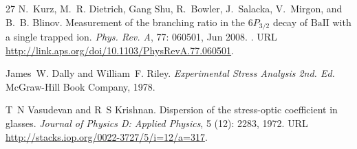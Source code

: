 \documentclass[%
 reprint,
 amsmath,amssymb,
 aps,
]{revtex4-1}
\begin{document}
\begin{thebibliography}{27}
N.~Kurz, M.~R. Dietrich, Gang Shu, R.~Bowler, J.~Salacka, V.~Mirgon, and B.~B.
  Blinov.
\newblock Measurement of the branching ratio in the $6{P}_{3/2}$ decay of
  $\mathrm{Ba} \mathrm{II}$ with a single trapped ion.
\newblock \emph{Phys. Rev. A}, 77: 060501, Jun 2008.
\newblock {}.
\newblock URL \url{http://link.aps.org/doi/10.1103/PhysRevA.77.060501}.

James~W. Dally and William~F. Riley.
\newblock \emph{Experimental Stress Analysis 2nd. Ed.}
\newblock McGraw-Hill Book Company, 1978.

T~N Vasudevan and R~S Krishnan.
\newblock Dispersion of the stress-optic coefficient in glasses.
\newblock \emph{Journal of Physics D: Applied Physics}, 5
  (12): 2283, 1972.
\newblock URL \url{http://stacks.iop.org/0022-3727/5/i=12/a=317}.

\end{thebibliography}

    
\end{document}
